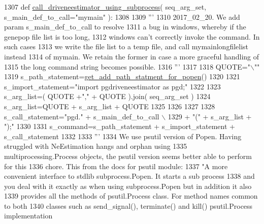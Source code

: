 \begin{DoxyCode}
1307 \textcolor{keyword}{def }\hyperlink{namespacenegui_1_1pgutilities_ad33c328d8fe2b8fe9489c512c18d1765}{call\_driveneestimator\_using\_subprocess}( seq\_arg\_set, 
      s\_main\_def\_to\_call="mymain" ):
1308 
1309     \textcolor{stringliteral}{'''}
1310 \textcolor{stringliteral}{    2017\_02\_20.  We add param s\_main\_def\_to\_call to resolve}
1311 \textcolor{stringliteral}{    a bug in windows, whereby if the genepop file list is too long,}
1312 \textcolor{stringliteral}{    windows can't correctly invoke the command.  In such cases}
1313 \textcolor{stringliteral}{    we write the file list to a temp file, and call mymainlongfilelist instead}
1314 \textcolor{stringliteral}{    of mymain.  We retain the former in case a more graceful handling of}
1315 \textcolor{stringliteral}{    the long command string becomes possible.}
1316 \textcolor{stringliteral}{    '''}
1317 
1318     QUOTE=\textcolor{stringliteral}{"\(\backslash\)""}
1319     s\_path\_statement=\hyperlink{namespacenegui_1_1pgutilities_a606a7615fe2e94332376016ce8abe372}{get\_add\_path\_statment\_for\_popen}()
1320 
1321     s\_import\_statement=\textcolor{stringliteral}{"import pgdriveneestimator as pgd;"}
1322 
1323     s\_arg\_list=( QUOTE +\textcolor{stringliteral}{","} + QUOTE ).join( seq\_arg\_set )
1324     s\_arg\_list=QUOTE + s\_arg\_list + QUOTE
1325 
1326     
1327 
1328     s\_call\_statement=\textcolor{stringliteral}{"pgd."} + s\_main\_def\_to\_call \(\backslash\)
1329                                 + \textcolor{stringliteral}{"("} + s\_arg\_list + \textcolor{stringliteral}{");"} 
1330 
1331     s\_command=s\_path\_statement + s\_import\_statement + s\_call\_statement
1332 
1333     \textcolor{stringliteral}{'''}
1334 \textcolor{stringliteral}{    We use psutil version of Popen.  Having struggled with NeEstimation hangs and orphan using}
1335 \textcolor{stringliteral}{    multiprocessing.Process objects, the psutil version seems better able to perform for this }
1336 \textcolor{stringliteral}{    chore.  This from the docs for psutil module:}
1337 \textcolor{stringliteral}{            "A more convenient interface to stdlib subprocess.Popen. It starts a sub process }
1338 \textcolor{stringliteral}{            and you deal with it exactly as when using subprocess.Popen but in addition it also }
1339 \textcolor{stringliteral}{            provides all the methods of psutil.Process class. For method names common to both }
1340 \textcolor{stringliteral}{            classes such as send\_signal(), terminate() and kill() psutil.Process implementation }

\end{DoxyCode}

